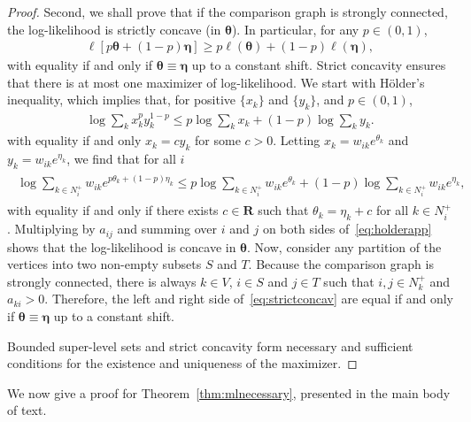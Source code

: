 \begin{proof}
Second, we shall prove that if the comparison graph is strongly connected, the log-likelihood is strictly concave (in $\bm{\theta}$).
In particular, for any $p \in (0,1)$,
\begin{align}
\label{eq:strictconcav}
\ell \left[ p \bm{\theta} + (1-p) \bm{\eta} \right] \ge p \ell(\bm{\theta}) + (1-p) \ell(\bm{\eta}),
\end{align}
with equality if and only if $\bm{\theta} \equiv \bm{\eta}$ up to a constant shift.
Strict concavity ensures that there is at most one maximizer of log-likelihood.
We start with Hölder's inequality, which implies that, for positive $\{ x_k \}$ and $\{ y_k \}$, and $p \in (0,1)$,
\begin{align*}
\log \sum_k x_k^p y_k^{1-p} \le p \log \sum_k x_k + (1-p) \log \sum_k y_k.
\end{align*}
with equality if and only $x_k = c y_k$ for some $c > 0$.
Letting $x_k = w_{ik} e^{\theta_k}$ and $y_k = w_{ik} e^{\eta_k}$, we find that for all $i$
\begin{align}
\label{eq:holderapp}
\begin{aligned}
\log \sum_{k \in N^+_i} w_{ik} e^{p \theta_k + (1-p) \eta_k}
    \le p \log\!\sum_{k \in N^+_i}\!w_{ik} e^{\theta_k} + (1-p) \log\!\sum_{k \in N^+_i}\!w_{ik} e^{\eta_k},
\end{aligned}
\end{align}
with equality if and only if there exists $c \in \mathbf{R}$ such that $\theta_k = \eta_k + c$ for all $k \in N^+_{i}$.
Multiplying by $a_{ij}$ and summing over $i$ and $j$ on both sides of~\eqref{eq:holderapp} shows that the log-likelihood is concave in $\bm{\theta}$.
Now, consider any partition of the vertices into two non-empty subsets $S$ and $T$.
Because the comparison graph is strongly connected, there is always $k \in V$, $i \in S$ and $j \in T$ such that $i, j \in N^+_k$ and $a_{ki} > 0$.
Therefore, the left and right side of~\eqref{eq:strictconcav} are equal if and only if $\bm{\theta} \equiv \bm{\eta}$ up to a constant shift.

Bounded super-level sets and strict concavity form necessary and sufficient conditions for the existence and uniqueness of the maximizer.
\end{proof}

We now give a proof for Theorem~\ref{thm:mlnecessary}, presented in the main body of text.


